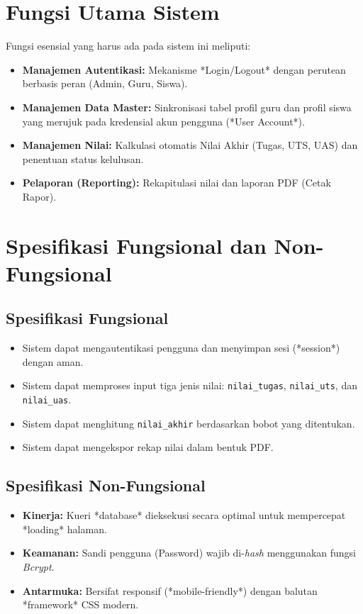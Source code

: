 \documentclass[12pt, a4paper]{article}
\begin{document}
\section{Fungsi Utama Sistem}
Fungsi esensial yang harus ada pada sistem ini meliputi:
\begin{itemize}
    \item \textbf{Manajemen Autentikasi:} Mekanisme *Login/Logout* dengan perutean berbasis peran (Admin, Guru, Siswa).
    \item \textbf{Manajemen Data Master:} Sinkronisasi tabel profil guru dan profil siswa yang merujuk pada kredensial akun pengguna (*User Account*).
    \item \textbf{Manajemen Nilai:} Kalkulasi otomatis Nilai Akhir (Tugas, UTS, UAS) dan penentuan status kelulusan.
    \item \textbf{Pelaporan (Reporting):} Rekapitulasi nilai dan laporan PDF (Cetak Rapor).
\end{itemize}

\section{Spesifikasi Fungsional dan Non-Fungsional}
\subsection{Spesifikasi Fungsional}
\begin{itemize}
    \item Sistem dapat mengautentikasi pengguna dan menyimpan sesi (*session*) dengan aman.
    \item Sistem dapat memproses input tiga jenis nilai: \texttt{nilai\_tugas}, \texttt{nilai\_uts}, dan \texttt{nilai\_uas}.
    \item Sistem dapat menghitung \texttt{nilai\_akhir} berdasarkan bobot yang ditentukan.
    \item Sistem dapat mengekspor rekap nilai dalam bentuk PDF.
\end{itemize}

\subsection{Spesifikasi Non-Fungsional}
\begin{itemize}
    \item \textbf{Kinerja:} Kueri *database* dieksekusi secara optimal untuk mempercepat *loading* halaman.
    \item \textbf{Keamanan:} Sandi pengguna (Password) wajib di-\textit{hash} menggunakan fungsi \textit{Bcrypt}.
    \item \textbf{Antarmuka:} Bersifat responsif (*mobile-friendly*) dengan balutan *framework* CSS modern.
\end{itemize}
\end{document}
